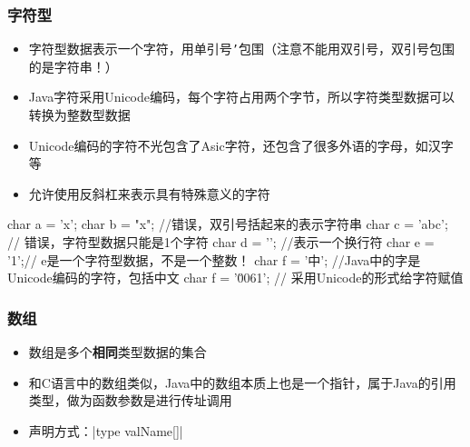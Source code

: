 \begin{frame}[fragile]
  \frametitle{字符型}
  \begin{itemize}
    \item 字符型数据表示一个字符，用单引号\texttt{'}包围（注意不能用双引号，双引号包围的是字符串！）
    \item Java字符采用Unicode编码，每个字符占用两个字节，所以字符类型数据可以转换为整数型数据
    \item Unicode编码的字符不光包含了Asic字符，还包含了很多外语的字母，如汉字等
    \item 允许使用反斜杠来表示具有特殊意义的字符
  \end{itemize}
  \begin{javacode}
    char a = 'x';
    char b = "x"; //错误，双引号括起来的表示字符串
    char c = 'abc'; // 错误，字符型数据只能是1个字符
    char d = '\n'; //表示一个换行符
    char e = '1';// e是一个字符型数据，不是一个整数！
    char f = '中'; //Java中的字是Unicode编码的字符，包括中文
    char f = '\u0061'; // 采用Unicode的形式给字符赋值
  \end{javacode}
\end{frame}

\begin{frame}
  \frametitle{数组}
  \begin{itemize}
    \item 数组是多个\textbf{相同}类型数据的集合
    \item 和C语言中的数组类似，Java中的数组本质上也是一个指针，属于Java的引用类型，做为函数参数是进行传址调用
    \item 声明方式：\java|type valName[]|
  \end{itemize}
\end{frame}